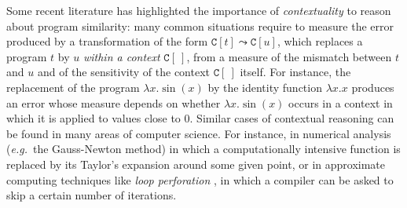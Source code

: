   

 
  
% 
%  
%
%
% 
% 
%  

Some recent literature \cite{chaudhuri, dallago:differential-stlc} has highlighted the importance of \emph{contextuality} to reason about program similarity: many common situations  require to measure the error produced by a transformation of the form $\mathtt C[t] \leadsto \mathtt C[u]$, which replaces a program $t$ by $u$ \emph{within a context} $\mathtt C[\ ]$, from a measure of the mismatch between $t$ and $u$ and of the sensitivity of the context $\mathtt C[\ ]$ itself.
%
%
%
%
%
  For instance, the replacement of the program $\lambda x.\sin(x)$ by the identity function $\lambda x.x$
  produces an error whose measure depends on whether
$\lambda x.\sin(x)$
occurs in a context in which it is applied to values close to $0$.
 Similar cases of contextual reasoning can be found  in many areas of computer science. For instance, 
 in numerical analysis (\emph{e.g.}~the Gauss-Newton method) in which a 
 computationally intensive function is replaced by its Taylor's expansion {around some given point}, or in {approximate computing} techniques like \emph{loop perforation} \cite{loopperf}, in which a compiler can be asked to skip a certain number of iterations.%
 

% 
% 
% 
 
